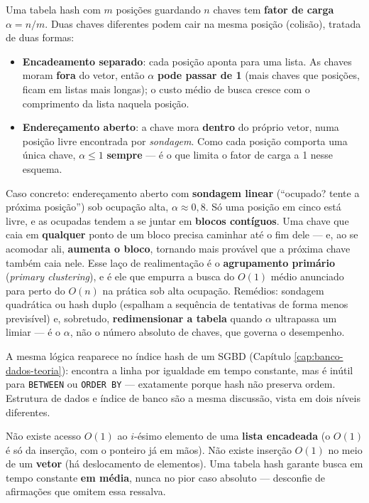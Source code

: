 \begin{exemplo}
Uma tabela hash com $m$ posições guardando $n$ chaves tem \textbf{fator de
carga} $\alpha = n/m$. Duas chaves diferentes podem cair na mesma posição
(colisão), tratada de duas formas:

\begin{itemize}
\item \textbf{Encadeamento separado}: cada posição aponta para uma lista.
As chaves moram \textbf{fora} do vetor, então $\alpha$ \textbf{pode passar
de 1} (mais chaves que posições, ficam em listas mais longas); o custo
médio de busca cresce com o comprimento da lista naquela posição.
\item \textbf{Endereçamento aberto}: a chave mora \textbf{dentro} do
próprio vetor, numa posição livre encontrada por \textit{sondagem}. Como
cada posição comporta uma única chave, $\alpha \le 1$ \textbf{sempre} ---
é o que limita o fator de carga a 1 nesse esquema.
\end{itemize}

Caso concreto: endereçamento aberto com \textbf{sondagem linear}
(“ocupado? tente a próxima posição”) sob ocupação alta, $\alpha \approx
0{,}8$. Só uma posição em cinco está livre, e as ocupadas tendem a se
juntar em \textbf{blocos contíguos}. Uma chave que caia em \textbf{
qualquer} ponto de um bloco precisa caminhar até o fim dele --- e, ao se
acomodar ali, \textbf{aumenta o bloco}, tornando mais provável que a
próxima chave também caia nele. Esse laço de realimentação é o
\textbf{agrupamento primário} (\textit{primary clustering}), e é ele que
empurra a busca do $O(1)$ médio anunciado para perto do $O(n)$ na prática
sob alta ocupação. Remédios: sondagem quadrática ou hash duplo (espalham
a sequência de tentativas de forma menos previsível) e, sobretudo,
\textbf{redimensionar a tabela} quando $\alpha$ ultrapassa um limiar --- é
o $\alpha$, não o número absoluto de chaves, que governa o desempenho.

A mesma lógica reaparece no índice hash de um SGBD (Capítulo
\ref{cap:banco-dados-teoria}): encontra a linha por igualdade em tempo
constante, mas é inútil para \texttt{BETWEEN} ou \texttt{ORDER BY} ---
exatamente porque hash não preserva ordem. Estrutura de dados e índice de
banco são a mesma discussão, vista em dois níveis diferentes.
\end{exemplo}

\begin{cuidado}
Não existe acesso $O(1)$ ao $i$-ésimo elemento de uma \textbf{lista
encadeada} (o $O(1)$ é só da inserção, com o ponteiro já em mãos). Não
existe inserção $O(1)$ no meio de um \textbf{vetor} (há deslocamento de
elementos). Uma tabela hash garante busca em tempo constante \textbf{em
média}, nunca no pior caso absoluto --- desconfie de afirmações que
omitem essa ressalva.
\end{cuidado}

